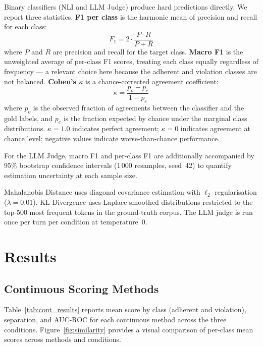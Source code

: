 \documentclass[11pt,a4paper]{article}
\begin{document}
Binary classifiers (NLI and LLM Judge) produce hard predictions directly.
We report three statistics.
\textbf{F1 per class} \citep{manning2008ir} is the harmonic mean of precision
and recall for each class:
\begin{equation}
  F_1 = 2 \cdot \frac{P \cdot R}{P + R}
\end{equation}
where $P$ and $R$ are precision and recall for the target class.
\textbf{Macro F1} is the unweighted average of per-class F1 scores,
treating each class equally regardless of frequency --- a relevant choice
here because the adherent and violation classes are not balanced.
\textbf{Cohen's $\kappa$} \citep{cohen1960kappa} is a chance-corrected
agreement coefficient:
\begin{equation}
  \kappa = \frac{p_o - p_e}{1 - p_e}
\end{equation}
where $p_o$ is the observed fraction of agreements between the classifier
and the gold labels, and $p_e$ is the fraction expected by chance under the
marginal class distributions. $\kappa = 1.0$ indicates perfect agreement;
$\kappa = 0$ indicates agreement at chance level; negative values indicate
worse-than-chance performance.

For the LLM Judge, macro F1 and per-class F1 are additionally accompanied by
95\% bootstrap confidence intervals (1\,000 resamples, seed~42) to quantify
estimation uncertainty at each sample size.

Mahalanobis Distance uses diagonal covariance estimation with $\ell_2$
regularisation ($\lambda = 0.01$). KL Divergence uses Laplace-smoothed
distributions restricted to the top-500 most frequent tokens in the
ground-truth corpus. The LLM judge is run once per turn per condition at
temperature~0.

\section{Results}
\label{sec:results}

\subsection{Continuous Scoring Methods}

Table~\ref{tab:cont_results} reports mean score by class (adherent and
violation), separation, and AUC-ROC for each continuous method across the
three conditions. Figure~\ref{fig:similarity} provides a visual comparison
of per-class mean scores across methods and conditions.
\end{document}
